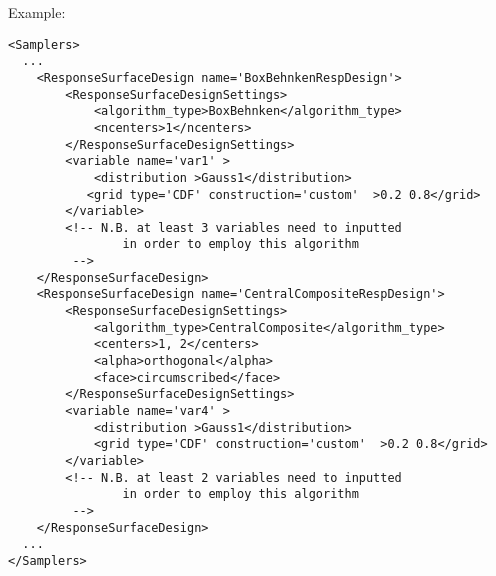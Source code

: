Example:
\begin{lstlisting}[style=XML,morekeywords={}]
<Samplers>
  ...
    <ResponseSurfaceDesign name='BoxBehnkenRespDesign'>
        <ResponseSurfaceDesignSettings>
            <algorithm_type>BoxBehnken</algorithm_type>
            <ncenters>1</ncenters>
        </ResponseSurfaceDesignSettings>
        <variable name='var1' >
            <distribution >Gauss1</distribution>
           <grid type='CDF' construction='custom'  >0.2 0.8</grid>
        </variable>
        <!-- N.B. at least 3 variables need to inputted
                in order to employ this algorithm
         -->
    </ResponseSurfaceDesign>
    <ResponseSurfaceDesign name='CentralCompositeRespDesign'>
        <ResponseSurfaceDesignSettings>
            <algorithm_type>CentralComposite</algorithm_type>
            <centers>1, 2</centers>
            <alpha>orthogonal</alpha>
            <face>circumscribed</face>
        </ResponseSurfaceDesignSettings>
        <variable name='var4' >
            <distribution >Gauss1</distribution>
            <grid type='CDF' construction='custom'  >0.2 0.8</grid>
        </variable>
        <!-- N.B. at least 2 variables need to inputted
                in order to employ this algorithm
         -->
    </ResponseSurfaceDesign>
  ...
</Samplers>
\end{lstlisting}

